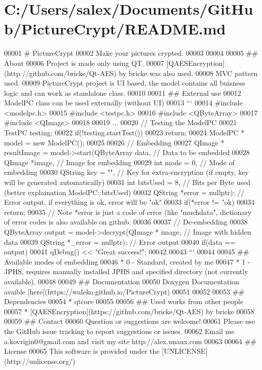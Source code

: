 \hypertarget{_r_e_a_d_m_e_8md_source}{}\section{C\+:/\+Users/salex/\+Documents/\+Git\+Hub/\+Picture\+Crypt/\+R\+E\+A\+D\+ME.md}

\begin{DoxyCode}
00001 # PictureCrypt
00002 Make your pictures crypted.
00003 
00004 
00005 ## About
00006 Project is made only using QT.
00007 [QAESEncryption](http://github.com/bricke/Qt-AES) by bricke was also used.
00008 MVC pattern used.
00009 PictureCrypt project is UI based, the model contains all buisness logic and can work as standalone
       class.
00010 
00011 ## External use
00012 ModelPC class can be used externally (without UI)
00013 ```
00014 #include <modelpc.h>
00015 #include <testpc.h>
00016 #include <QByteArray>
00017 #include <QImage>
00018 
00019 ...
00020 // Testing the ModelPC
00021 TestPC testing;
00022 if(!testing.startTest())
00023    return;
00024 ModelPC * model = new ModelPC();
00025 
00026 // Embedding
00027 QImage * resultImage = model->start(QByteArray data, // Data to be embedded
00028                                    QImage *image, // Image for embedding
00029                                    int mode = 0, // Mode of embedding
00030                                    QString key = "", // Key for extra-encryption (if empty, key will
       be generated automatically)
00031                                    int bitsUsed = 8, // Bits per Byte used (better explaination
       ModelPC::bitsUsed)
00032                                    QString *error = nullptr); // Error output, if everything is ok,
       error will be "ok"
00033 if(*error != "ok)
00034    return;
00035 // Note *error is just a code of error (like "muchdata", dictionary of error codes is also available
       on github.
00036 
00037 // De-embedding
00038 QByteArray output = model->decrypt(QImage * image, // Image with hidden data
00039                                   QString *\_error = nullptr); // Error output
00040 if(data == output)
00041    qDebug() << "Great success!";
00042     
00043 ```
00044 
00045 ## Available modes of embedding
00046 * 0 - Standard, created by me
00047 * 1 - JPHS, requires manually installed JPHS and specified directory (not currently available).
00048 
00049 ## Documentation
00050 Doxygen Documentation avaible [here](https://waleko.github.io/PictureCrypt)
00051 
00052 
00053 ## Dependencies
00054 * qtcore
00055 
00056 ## Used works from other people
00057  * [QAESEncryption](https://github.com/bricke/Qt-AES) by bricke
00058 
00059 ## Contact
00060 Question or suggestions are welcome!
00061 Please use the GitHub issue tracking to report suggestions or issues.
00062 Email me a.kovrigin0@gmail.com and visit my site http://alex.unaux.com
00063 
00064 ## License
00065 This software is provided under the [UNLICENSE](http://unlicense.org/)
\end{DoxyCode}
